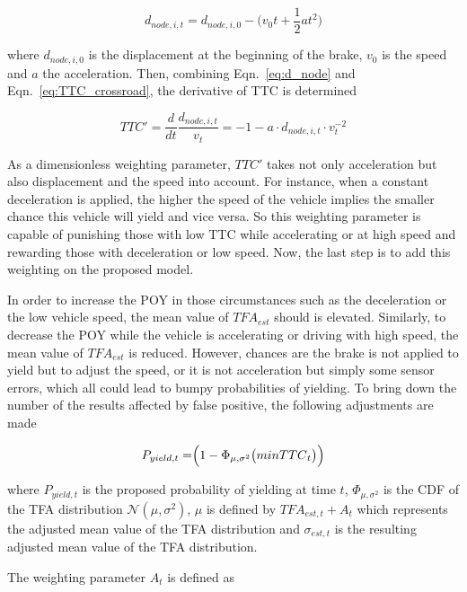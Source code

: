 \begin{equation}
d_{node, i, t} = d_{node,i,0} - \biggl(v_0t+\frac{1}{2}at^2\biggr)
\label{eq:d_node}
\end{equation}

\noindent where $d_{node,i,0}$ is the displacement at the beginning of the brake, $v_0$ is the speed and $a$ the acceleration. Then, combining Eqn.~\ref{eq:d_node} and Eqn.~\ref{eq:TTC_crossroad}, the derivative of TTC is determined

\begin{equation}
TTC' = \frac{d}{dt}\frac{d_{node,i,t}}{v_t} = -1 -a \cdot d_{node,i,t} \cdot v_t^{-2}
\label{eq:TTC'}
\end{equation}

As a dimensionless weighting parameter, $TTC'$ takes not only acceleration but also displacement and the speed into account. For instance, when a constant deceleration is applied, the higher the speed of the vehicle implies the smaller chance this vehicle will yield and vice versa. So this weighting parameter is capable of punishing those with low TTC while accelerating or at high speed and rewarding those with deceleration or low speed. Now, the last step is to add this weighting on the proposed model. 

In order to increase the POY in those circumstances such as the deceleration or the low vehicle speed, the mean value of ${TFA}_{est}$ should is elevated. Similarly, to decrease the POY while the vehicle is accelerating or driving with high speed, the mean value of ${TFA}_{est}$ is reduced. However, chances are the brake is not applied to yield but to adjust the speed, or it is not acceleration but simply some sensor errors, which all could lead to bumpy probabilities of yielding. To bring down the number of the results affected by false positive, the following adjustments are made


\begin{equation}
    P_{yield, t} = \Bigr(1-\Phi_{\mu, \sigma^{2}}\big({min TTC}_{t}\big)\Bigl)
\label{eq:POY}
\end{equation}

where  $P_{yield, t}$ is the proposed probability of yielding at time $t$, $\Phi_{\mu, \sigma^{2}}$ is the CDF of the TFA distribution $\mathcal{N}(\mu,\sigma^{2})$, $\mu$ is defined by ${TFA}_{est, t} + A_{t}$ which represents the adjusted mean value of the TFA distribution and $\sigma_{est, t}$ is the resulting adjusted mean value of the TFA distribution.

The weighting parameter $A_{t}$ is defined as

